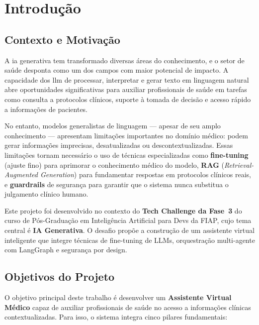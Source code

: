 
\chapter{Introdução}

\section{Contexto e Motivação}

A \acrfull{ia} generativa tem transformado diversas áreas do conhecimento, e o setor de saúde desponta como um dos campos com maior potencial de impacto. A capacidade dos \acrfull{llm} de processar, interpretar e gerar texto em linguagem natural abre oportunidades significativas para auxiliar profissionais de saúde em tarefas como consulta a protocolos clínicos, suporte à tomada de decisão e acesso rápido a informações de pacientes.

No entanto, modelos generalistas de linguagem --- apesar de seu amplo conhecimento --- apresentam limitações importantes no domínio médico: podem gerar informações imprecisas, desatualizadas ou descontextualizadas. Essas limitações tornam necessário o uso de técnicas especializadas como \textbf{fine-tuning} (ajuste fino) para aprimorar o conhecimento médico do modelo, \textbf{RAG} (\textit{Retrieval-Augmented Generation}) para fundamentar respostas em protocolos clínicos reais, e \textbf{guardrails} de segurança para garantir que o sistema nunca substitua o julgamento clínico humano.

Este projeto foi desenvolvido no contexto do \textbf{Tech Challenge da Fase~3} do curso de Pós-Graduação em Inteligência Artificial para Devs da FIAP, cujo tema central é \textbf{IA Generativa}. O desafio propõe a construção de um assistente virtual inteligente que integre técnicas de fine-tuning de LLMs, orquestração multi-agente com LangGraph e segurança por design.

\section{Objetivos do Projeto}

O objetivo principal deste trabalho é desenvolver um \textbf{Assistente Virtual Médico} capaz de auxiliar profissionais de saúde no acesso a informações clínicas contextualizadas. Para isso, o sistema integra cinco pilares fundamentais:

